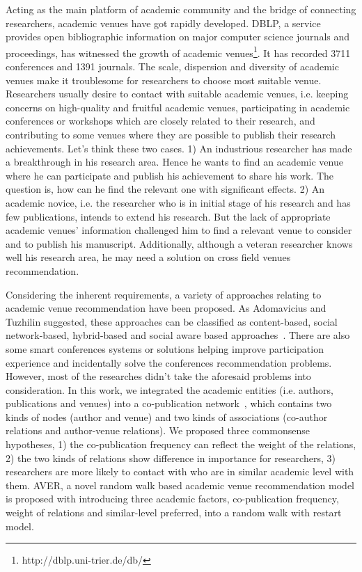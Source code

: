 \documentclass[9pt]{acm_proc_article-sp}
\begin{document}
Acting as the main platform of academic community and the bridge of connecting researchers, academic venues have got rapidly developed. DBLP, a service provides open bibliographic information on major computer science journals and proceedings, has witnessed the growth of academic venues\footnote{http://dblp.uni-trier.de/db/}. It has recorded 3711 conferences and 1391 journals. The scale, dispersion and diversity of academic venues make it troublesome for researchers to choose most suitable venue. Researchers usually desire to contact with suitable academic venues, i.e. keeping concerns on high-quality and fruitful academic venues, participating in academic conferences or workshops which are closely related to their research, and contributing to some venues where they are possible to publish their research achievements. Let's think these two cases. 1) An industrious researcher has made a breakthrough in his research area. Hence he wants to find an academic venue where he can participate and publish his achievement to share his work. The question is, how can he find the relevant one with significant effects. 2) An academic novice, i.e. the researcher who is in initial stage of his research and has few publications, intends to extend his research. But the lack of appropriate academic venues' information challenged him to find a relevant venue to consider and to publish his manuscript. Additionally, although a veteran researcher knows well his research area, he may need a solution on cross field venues recommendation.

Considering the inherent requirements, a variety of approaches relating to academic venue recommendation have been proposed. As Adomavicius and Tuzhilin suggested, these approaches can be classified as content-based, social network-based, hybrid-based and social aware based approaches~\cite{adomavicius2005toward}. There are also some smart conferences systems or solutions helping improve participation experience and incidentally solve the conferences recommendation problems. However, most of the researches didn't take the aforesaid problems into consideration. In this work, we integrated the academic entities (i.e. authors, publications and venues) into a co-publication network~\cite{lemarchand2012long}, which contains two kinds of nodes (author and venue) and two kinds of associations (co-author relations and author-venue relations). We proposed three commonsense  hypotheses, 1) the co-publication frequency can reflect the weight of the relations, 2) the two kinds of relations show difference in importance for researchers, 3) researchers are more likely to contact with who are in similar academic level with them. AVER, a novel random walk based academic venue recommendation model is proposed with introducing three academic factors, co-publication frequency, weight of relations and similar-level preferred, into a random walk with restart model.
\end{document}
